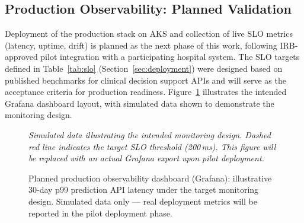 \documentclass[11pt,letterpaper]{article}
\begin{document}
\subsection{Production Observability: Planned Validation}

Deployment of the production stack on AKS and collection of live SLO metrics (latency, uptime, drift) is planned as the next phase of this work, following IRB-approved pilot integration with a participating hospital system. The SLO targets defined in Table~\ref{tab:slo} (Section~\ref{sec:deployment}) were designed based on published benchmarks for clinical decision support APIs \citep{sculley2015hidden,beyer2016site} and will serve as the acceptance criteria for production readiness. Figure~\ref{fig:dashboard} illustrates the intended Grafana dashboard layout, with simulated data shown to demonstrate the monitoring design.

\begin{figure}[H]
\centering
\begin{tcolorbox}[
  enhanced, colback=gray!8, colframe=niw-gray,
  boxrule=0.5pt, arc=4pt, left=6pt, right=6pt, top=6pt, bottom=6pt,
  width=0.92\textwidth
]
\begin{center}
\end{center}
\smallskip
\footnotesize\textit{Simulated data illustrating the intended monitoring design. Dashed red line indicates the target SLO threshold (200\,ms). This figure will be replaced with an actual Grafana export upon pilot deployment.}
\end{tcolorbox}
\caption{Planned production observability dashboard (Grafana): illustrative 30-day p99 prediction API latency under the target monitoring design. Simulated data only --- real deployment metrics will be reported in the pilot deployment phase.}
\label{fig:dashboard}
\end{figure}
\end{document}
